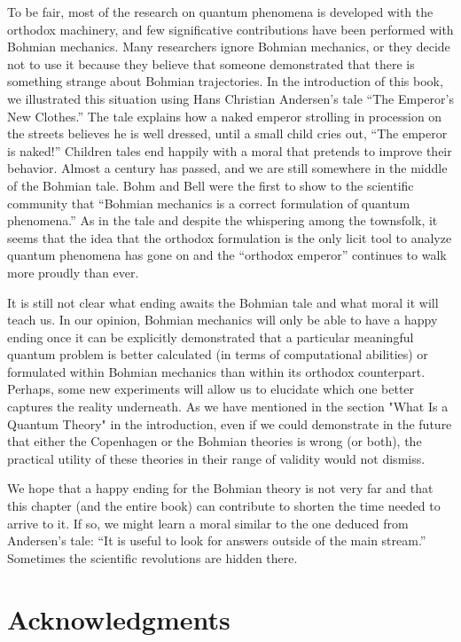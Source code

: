 \documentclass[nofootinbib, secnumarabic, amsmath, nobibnotes,11pt,aps,pra, floatfix]{revtex4-1}
\begin{document}
To be fair, most of the research on quantum phenomena is developed
with the orthodox machinery, and few significative contributions
have been performed with Bohmian mechanics. Many researchers ignore
Bohmian mechanics, or they decide not to use it because they believe
that someone demonstrated that there is something strange about
Bohmian trajectories. In the introduction of this book, we illustrated
this situation using Hans Christian Andersen's tale ``The Emperor's
New Clothes.'' The tale explains how a naked emperor strolling in
procession on the streets believes he is well dressed, until a small
child cries out, ``The emperor is naked!'' Children tales end
happily with a moral that pretends to improve their behavior. Almost
a century has passed, and we are still somewhere in the middle of
the Bohmian tale. Bohm and Bell were the first to show to the
scientific community that ``Bohmian mechanics is a correct
formulation of quantum phenomena.'' As in the tale and despite the
whispering among the townsfolk, it seems that the idea that the
orthodox formulation is the only licit tool to analyze quantum
phenomena has gone on and the ``orthodox emperor'' continues to walk
more proudly than ever.

It is still not clear what ending awaits the Bohmian tale and what
moral it will teach us. In our opinion, Bohmian mechanics will only
be able to have a happy ending once it can be explicitly
demonstrated that a particular  meaningful quantum problem is better calculated
(in terms of computational abilities) or formulated within Bohmian
mechanics than within its orthodox counterpart. Perhaps, some new experiments will allow us to elucidate which one better captures the reality underneath. 
As we have mentioned in the section "What Is a Quantum Theory" in the introduction, even if we could demonstrate in the future that either the Copenhagen or the Bohmian theories is wrong (or both), the practical utility of these theories in their range of validity would not dismiss. 

We hope that a happy ending for the Bohmian theory is not very far and that this chapter (and the entire book) can contribute to shorten the time needed to arrive to it. If so, we might learn a moral similar to the one deduced from Andersen's tale: ``It is useful to look for answers outside of the main stream.'' Sometimes the scientific revolutions are hidden there.\vspace*{-9pt}\\


\section*{Acknowledgments}
\end{document}
